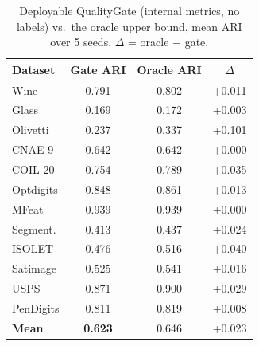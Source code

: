 \begin{table}[!t]
\centering
\caption{Deployable QualityGate (internal metrics, no labels) vs.\ the oracle upper bound, mean ARI over 5 seeds. $\Delta$ = oracle $-$ gate.}
\label{tab:gate}
\footnotesize
\setlength{\tabcolsep}{4pt}
\begin{tabular}{lccc}
\toprule
Dataset & Gate ARI & Oracle ARI & $\Delta$ \\
\midrule
Wine & 0.791 & 0.802 & +0.011 \\
Glass & 0.169 & 0.172 & +0.003 \\
Olivetti & 0.237 & 0.337 & +0.101 \\
CNAE-9 & 0.642 & 0.642 & +0.000 \\
COIL-20 & 0.754 & 0.789 & +0.035 \\
Optdigits & 0.848 & 0.861 & +0.013 \\
MFeat & 0.939 & 0.939 & +0.000 \\
Segment. & 0.413 & 0.437 & +0.024 \\
ISOLET & 0.476 & 0.516 & +0.040 \\
Satimage & 0.525 & 0.541 & +0.016 \\
USPS & 0.871 & 0.900 & +0.029 \\
PenDigits & 0.811 & 0.819 & +0.008 \\
\midrule
\textbf{Mean} & \textbf{0.623} & 0.646 & +0.023 \\
\bottomrule
\end{tabular}
\end{table}
